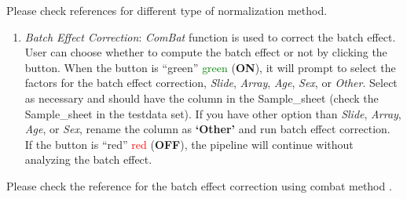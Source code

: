 \documentclass[
  a4paper,
  oneside,
  open=any]{scrreport}
\providecommand{\tightlist}{%
  \setlength{\itemsep}{0pt}\setlength{\parskip}{0pt}}\usepackage{longtable,booktabs,array}
\begin{document}
\begin{tcolorbox}[enhanced jigsaw, bottomrule=.15mm, left=2mm, coltitle=black, breakable, colback=white, arc=.35mm, rightrule=.15mm, opacitybacktitle=0.6, toptitle=1mm, leftrule=.75mm, toprule=.15mm, bottomtitle=1mm, opacityback=0, colbacktitle=quarto-callout-tip-color!10!white, titlerule=0mm, colframe=quarto-callout-tip-color-frame, title=\textcolor{quarto-callout-tip-color}{\faLightbulb}\hspace{0.5em}{Tip}]

Please check references for different type of normalization method.

\end{tcolorbox}

\begin{enumerate}
\def\labelenumi{\arabic{enumi}.}
\setcounter{enumi}{3}
\tightlist
\item
  \emph{Batch Effect Correction}: \emph{ComBat} function is used to
  correct the batch effect. User can choose whether to compute the batch
  effect or not by clicking the button. When the button is {``green''}
  \textcolor{green}{green} (\textbf{ON}), it will prompt to select the
  factors for the batch effect correction, \emph{Slide}, \emph{Array},
  \emph{Age}, \emph{Sex}, or \emph{Other}. Select as necessary and
  should have the column in the Sample\_sheet (check the Sample\_sheet
  in the testdata set). If you have other option than \emph{Slide},
  \emph{Array}, \emph{Age}, or \emph{Sex}, rename the column as
  \textbf{`Other'} and run batch effect correction.\\
  If the button is {``red''} \textcolor{red}{red} (\textbf{OFF}), the
  pipeline will continue without analyzing the batch effect.
\end{enumerate}

\begin{tcolorbox}[enhanced jigsaw, bottomrule=.15mm, left=2mm, coltitle=black, breakable, colback=white, arc=.35mm, rightrule=.15mm, opacitybacktitle=0.6, toptitle=1mm, leftrule=.75mm, toprule=.15mm, bottomtitle=1mm, opacityback=0, colbacktitle=quarto-callout-tip-color!10!white, titlerule=0mm, colframe=quarto-callout-tip-color-frame, title=\textcolor{quarto-callout-tip-color}{\faLightbulb}\hspace{0.5em}{Tip}]

Please check the reference for the batch effect correction using combat
method \autocite{johnson2007adjusting}.

\end{tcolorbox}
\end{document}
